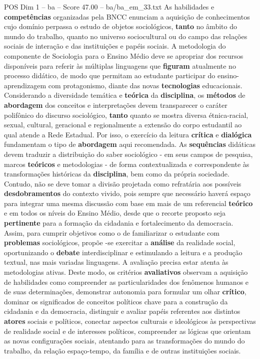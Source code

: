 \begin{textsample}{POS Dim 1 – ba – Score 47.00 – ba/ba\_em\_33.txt}
As habilidades e \textbf{competências} organizadas pela BNCC enunciam a aquisição de conhecimentos cujo domínio perpassa o estudo de objetos sociológicos, \textbf{tanto} no âmbito do mundo do trabalho, quanto no universo sociocultural ou do campo das relações sociais de interação e das instituições e papéis sociais.
A metodologia do componente de Sociologia para o Ensino Médio deve se apropriar dos recursos disponíveis para referir às múltiplas linguagens que \textbf{figuram} atualmente no processo didático, de modo que permitam ao estudante participar do ensino-aprendizagem com protagonismo, diante das novas \textbf{tecnologias} educacionais.
Considerando a diversidade temática e \textbf{teórica} da \textbf{disciplina}, os \textbf{métodos} de \textbf{abordagem} dos conceitos e interpretações devem transparecer o caráter polifônico do discurso sociológico, \textbf{tanto} quanto se mostra diversa étnica-racial, sexual, cultural, geracional e regionalmente a extensão do corpo estudantil ao qual atende a Rede Estadual.
Por isso, o exercício da leitura \textbf{crítica} e \textbf{dialógica} fundamentam o tipo de \textbf{abordagem} aqui recomendada.
As \textbf{sequências} didáticas devem traduzir a distribuição do saber sociológico - em seus campos de pesquisa, marcos \textbf{teóricos} e metodologias - de forma contextualizada e correspondente às transformações históricas da \textbf{disciplina}, bem como da própria sociedade.
Contudo, não se deve tomar a divisão projetada como refratária aos possíveis \textbf{desdobramentos} do contexto vivido, pois sempre que necessário haverá espaço para integrar uma mesma discussão com base em mais de um referencial \textbf{teórico} e em todos os níveis do Ensino Médio, desde que o recorte proposto seja \textbf{pertinente} para a formação da cidadania e fortalecimento da democracia.
Assim, para cumprir objetivos como o de familiarizar o estudante com \textbf{problemas} sociológicos, propõe -se exercitar a \textbf{análise} da realidade social, oportunizando o \textbf{debate} interdisciplinar e estimulando a leitura e a produção textual, nas mais variadas linguagens.
A avaliação precisa estar atenta às metodologias ativas.
Deste modo, os critérios \textbf{avaliativos} observam a aquisição de habilidades como compreender as particularidades dos fenômenos humanos e de suas determinações, demonstrar autonomia para formular um olhar \textbf{crítico}, dominar os significados de conceitos políticos chave para a construção da cidadania e da democracia, distinguir e avaliar papéis referentes aos distintos \textbf{atores} sociais e políticos, conectar aspectos culturais e ideológicos às perspectivas de realidade social e de interesses políticos, compreender as lógicas que orientam as novas configurações sociais, atentando para as transformações do mundo do trabalho, da relação espaço-tempo, da família e de outras instituições sociais.

\end{textsample}
